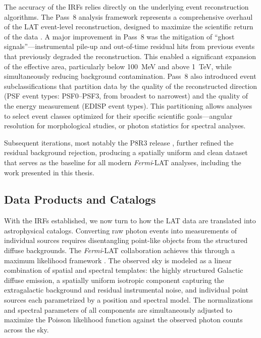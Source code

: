 The accuracy of the IRFs relies directly on the underlying event reconstruction algorithms.
The Pass~8 analysis framework represents a comprehensive overhaul of the LAT event-level reconstruction, designed to maximize the scientific return of the data \cite{Fermi-LAT:2013jgq}.
A major improvement in Pass~8 was the mitigation of ``ghost signals''---instrumental pile-up and out-of-time residual hits from previous events that previously degraded the reconstruction.
This enabled a significant expansion of the effective area, particularly below 100~MeV and above 1~TeV, while simultaneously reducing background contamination.
Pass~8 also introduced event subclassifications that partition data by the quality of the reconstructed direction (PSF event types: PSF0--PSF3, from broadest to narrowest) and the quality of the energy measurement (EDISP event types).
This partitioning allows analyses to select event classes optimized for their specific scientific goals---angular resolution for morphological studies, or photon statistics for spectral analyses.

Subsequent iterations, most notably the P8R3 release \cite{Bruel:2018lac}, further refined the residual background rejection, producing a spatially uniform and clean dataset that serves as the baseline for all modern \textit{Fermi}-LAT analyses, including the work presented in this thesis.

\subsection{Data Products and Catalogs}
\label{sec:data_products}
With the IRFs established, we now turn to how the LAT data are translated into astrophysical catalogs.
Converting raw photon events into measurements of individual sources requires disentangling point-like objects from the structured diffuse backgrounds.
The \textit{Fermi}-LAT collaboration achieves this through a maximum likelihood framework \cite{Mattox:1996zz,Fermi-LAT:2019yla}.
The observed sky is modeled as a linear combination of spatial and spectral templates: the highly structured Galactic diffuse emission, a spatially uniform isotropic component capturing the extragalactic background and residual instrumental noise, and individual point sources each parametrized by a position and spectral model.
The normalizations and spectral parameters of all components are simultaneously adjusted to maximize the Poisson likelihood function against the observed photon counts across the sky.

